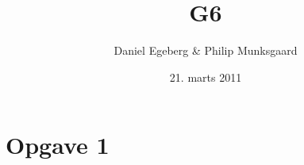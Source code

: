 \documentclass [10pt,a4paper]{article}
\title{G6}
\author{Daniel Egeberg \& Philip Munksgaard}
\date{21. marts 2011}
\begin{document}
\maketitle

\section*{Opgave 1} %
\end{document}
